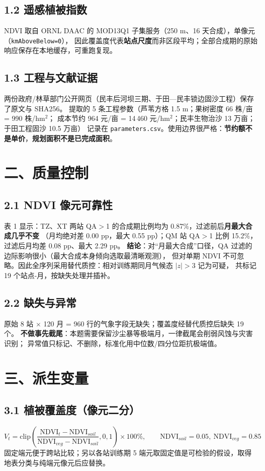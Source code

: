 \documentclass[11pt,a4paper]{ctexart}
\begin{document}
\subsection*{1.2 遥感植被指数}
NDVI 取自 ORNL DAAC 的 MOD13Q1 子集服务（250 m、16 天合成），单像元（\texttt{kmAboveBelow=0}），
因此覆盖度代表\textbf{站点尺度}而非区段平均；全部合成期的原始响应保存在本地缓存，可重跑复现。

\subsection*{1.3 工程与文献证据}
两份政府/林草部门公开网页（民丰后河坝三期、于田—民丰锁边固沙工程）保存了原文与 SHA256。
提取的 5 条工程参数（芦苇方格 1.5 m；果树密度 66 株/亩 = 990 株/hm$^2$；
成本节约 964 元/亩 = 14\,460 元/hm$^2$；民丰生物治沙 13 万亩；于田工程固沙 10.5 万亩）
记录在 \texttt{parameters.csv}。使用边界很严格：\textbf{节约额不是单价}，\textbf{规划面积不是已完成面积}。

\section*{二、质量控制}
\subsection*{2.1 NDVI 像元可靠性}
表 1 显示：TZ、XT 两站 QA$>$1 的合成期比例均为 0.87\%，过滤前后\textbf{月最大合成几乎不变}
（月均绝对差 0.00 pp，最大 0.55 pp）；QM 站 QA$>$1 比例 15.2\%，过滤后月均差 0.08 pp、最大 2.29 pp。
\textbf{结论}：对“月最大合成”口径，QA 过滤的边际影响很小（最大合成本身倾向选取最清晰观测），
但对单期 NDVI 不可忽略。因此全序列采用替代质控：相对训练期同月气候态 $|z|>3$ 记为可疑，
共标记 19 个站点-月，按缺失处理并插补。

\subsection*{2.2 缺失与异常}
原始 8 站 $\times$ 120 月 = 960 行的气象字段无缺失；覆盖度经替代质控后缺失 19 个。
\textbf{不做事先截尾}：本题需要保留沙尘暴等极端月，一律截尾会削弱风蚀与灾害识别；
异常值只标记、不删除，标准化用中位数/四分位距抗极端值。

\section*{三、派生变量}
\subsection*{3.1 植被覆盖度（像元二分）}
\begin{equation*}
V_t=\mathrm{clip}\!\left(\frac{\mathrm{NDVI}_t-\mathrm{NDVI}_{soil}}
{\mathrm{NDVI}_{veg}-\mathrm{NDVI}_{soil}},0,1\right)\times 100\%,
\qquad \mathrm{NDVI}_{soil}=0.05,\ \mathrm{NDVI}_{veg}=0.85
\end{equation*}
固定端元便于跨站比较；另以各站训练期 5%
端元取固定值是可检验的假设，取得地表分类与纯端元像元后应替换。
\end{document}
